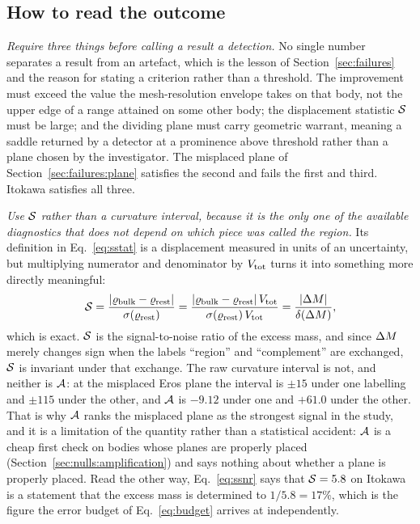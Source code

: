 \subsection{How to read the outcome}
\label{sec:guidelines:read}

\emph{Require three things before calling a result a detection.} No single
number separates a result from an artefact, which is the lesson of
Section~\ref{sec:failures} and the reason for stating a criterion rather
than a threshold. The improvement must exceed the value the mesh-resolution
envelope takes on that body, not the upper edge of a range attained on some
other body; the displacement statistic $\mathcal{S}$ must be large; and the
dividing plane must carry geometric warrant, meaning a saddle returned by a
detector at a prominence above threshold rather than a plane chosen by the
investigator. The misplaced plane of Section~\ref{sec:failures:plane}
satisfies the second and fails the first and third. Itokawa satisfies all
three.

\emph{Use $\mathcal{S}$ rather than a curvature interval, because it is the only
one of the available diagnostics that does not depend on which piece was
called the region.} Its definition in Eq.~\eqref{eq:sstat} is a displacement
measured in units of an uncertainty, but multiplying numerator and
denominator by $V_{\mathrm{tot}}$ turns it into something more directly meaningful:
%
\begin{equation}
\mathcal{S} = \frac{\lvert\varrho_{\mathrm{bulk}}-\varrho_{\mathrm{rest}}\rvert}{\sigma(\varrho_{\mathrm{rest}})}
       = \frac{\lvert\varrho_{\mathrm{bulk}}-\varrho_{\mathrm{rest}}\rvert\,V_{\mathrm{tot}}}
              {\sigma(\varrho_{\mathrm{rest}})\,V_{\mathrm{tot}}}
       = \frac{\lvert\Delta M\rvert}{\delta(\Delta M)} ,
\label{eq:ssnr}
\end{equation}
%
which is exact. $\mathcal{S}$ is the signal-to-noise ratio of the excess mass,
and since $\Delta M$ merely changes sign when the labels ``region'' and
``complement'' are exchanged, $\mathcal{S}$ is invariant under that exchange. The
raw curvature interval is not, and neither is $\mathcal{A}$: at the misplaced
Eros plane the interval is $\pm15$ under one labelling and $\pm115$ under
the other, and $\mathcal{A}$ is $-9.12$ under one and $+61.0$ under the other.
That is why $\mathcal{A}$ ranks the misplaced plane as the strongest signal in
the study, and it is a limitation of the quantity rather than a statistical
accident: $\mathcal{A}$ is a cheap first check on bodies whose planes are
properly placed (Section~\ref{sec:nulls:amplification}) and says nothing
about whether a plane is properly placed. Read the other way,
Eq.~\eqref{eq:ssnr} says that $\mathcal{S} = 5.8$ on Itokawa is a statement that
the excess mass is determined to $1/5.8 = 17\%$, which is the figure the
error budget of Eq.~\eqref{eq:budget} arrives at independently.

